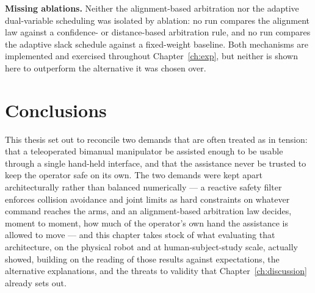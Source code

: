 \documentclass[12pt,a4paper,twoside,openright]{report}
\begin{document}
\textbf{Missing ablations.} Neither the alignment-based arbitration nor the adaptive dual-variable scheduling was isolated by ablation: no run compares the alignment law against a confidence- or distance-based arbitration rule, and no run compares the adaptive slack schedule against a fixed-weight baseline. Both mechanisms are implemented and exercised throughout Chapter~\ref{ch:exp}, but neither is shown here to outperform the alternative it was chosen over.

\chapter{Conclusions}
\label{ch:conclusions}

This thesis set out to reconcile two demands that are often treated as in tension: that a teleoperated bimanual manipulator be assisted enough to be usable through a single hand-held interface, and that the assistance never be trusted to keep the operator safe on its own. The two demands were kept apart architecturally rather than balanced numerically --- a reactive safety filter enforces collision avoidance and joint limits as hard constraints on whatever command reaches the arms, and an alignment-based arbitration law decides, moment to moment, how much of the operator's own hand the assistance is allowed to move --- and this chapter takes stock of what evaluating that architecture, on the physical robot and at human-subject-study scale, actually showed, building on the reading of those results against expectations, the alternative explanations, and the threats to validity that Chapter~\ref{ch:discussion} already sets out.
\end{document}
